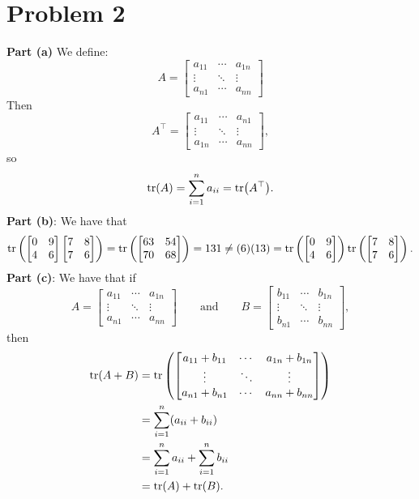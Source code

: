\documentclass[11pt]{article}
\begin{document}

\section{Problem 2}

\textbf{Part (a)} We define:
\[
	A = \begin{bmatrix} a_{11} & \cdots & a_{1n} \\ \vdots & \ddots & \vdots \\ a_{n1} & \cdots & a_{nn} \end{bmatrix}
\]
Then
\[
	A^{\top} = \begin{bmatrix} a_{11} & \cdots & a_{n1} \\ \vdots & \ddots & \vdots \\ a_{1n} & \cdots & a_{nn} \end{bmatrix},
\]
so
\[
	\tr(A) = \sum_{i = 1}^{n} a_{ii} = \tr(A^{\top}).
\]
\textbf{Part (b)}: We have that
\[
	\tr \left( \begin{bmatrix} 0 & 9 \\ 4 & 6 \end{bmatrix} \begin{bmatrix} 7 & 8 \\ 7 & 6 \end{bmatrix} \right) = \tr \left( \begin{bmatrix} 63 & 54 \\ 70 & 68 \end{bmatrix} \right) = 131 \ne (6)(13) = \tr \left( \begin{bmatrix} 0 & 9 \\ 4 & 6 \end{bmatrix} \right) \tr \left( \begin{bmatrix} 7 & 8 \\ 7 & 6 \end{bmatrix} \right).
\]
\textbf{Part (c)}: We have that if
\[
	A = \begin{bmatrix} a_{11} & \cdots & a_{1n} \\ \vdots & \ddots & \vdots \\ a_{n1} & \cdots & a_{nn} \end{bmatrix} \qquad \text{and} \qquad B = \begin{bmatrix} b_{11} & \cdots & b_{1n} \\ \vdots & \ddots & \vdots \\ b_{n1} & \cdots & b_{nn} \end{bmatrix},
\]
then
\begin{align*}
	\tr(A + B) &= \tr \left( \begin{bmatrix} a_{11} + b_{11} & \cdots & a_{1n} + b_{1n} \\ \vdots & \ddots & \vdots \\ a_{n1} + b_{n1} & \cdots & a_{nn} + b_{nn} \end{bmatrix} \right) \\
	&= \sum_{i = 1}^{n} (a_{ii} + b_{ii}) \\
	&= \sum_{i = 1}^{n} a_{ii} + \sum_{i = 1}^{n} b_{ii} \\
	&= \tr(A) + \tr(B).
\end{align*}
\end{document}
